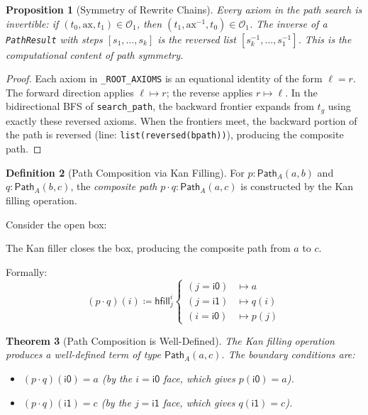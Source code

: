 \documentclass[11pt,a4paper]{report}
\theoremstyle{definition}
\newtheorem{definition}{Definition}[chapter]
\theoremstyle{plain}
\newtheorem{theorem}[definition]{Theorem}
\newtheorem{proposition}[definition]{Proposition}
\newcommand{\Path}{\mathsf{Path}}
\newcommand{\hfilling}{\mathsf{hfill}}
\begin{document}
\begin{proposition}[Symmetry of Rewrite Chains]
\label{prop:symmetry-rewrite}
Every axiom in the path search is invertible: if
$(t_0, \mathrm{ax}, t_1) \in \mathcal{O}_1$, then
$(t_1, \mathrm{ax}^{-1}, t_0) \in \mathcal{O}_1$.  The inverse of
a \texttt{PathResult} with steps $[s_1, \ldots, s_k]$ is the reversed
list $[s_k^{-1}, \ldots, s_1^{-1}]$.  This is the computational
content of path symmetry.
\end{proposition}

\begin{proof}
Each axiom in \texttt{\_ROOT\_AXIOMS} is an equational identity of the
form $\ell = r$.  The forward direction applies $\ell \mapsto r$;
the reverse applies $r \mapsto \ell$.  In the bidirectional BFS of
\texttt{search\_path}, the backward frontier expands from $t_g$ using
exactly these reversed axioms.  When the frontiers meet, the backward
portion of the path is reversed (line: \texttt{list(reversed(bpath))}),
producing the composite path.
\end{proof}

\begin{definition}[Path Composition via Kan Filling]
\label{def:composition}
For $p : \Path_A(a, b)$ and $q : \Path_A(b, c)$, the
\emph{composite path} $p \cdot q : \Path_A(a, c)$ is constructed
by the Kan filling operation.

Consider the open box:
\begin{center}
\end{center}

The Kan filler closes the box, producing the composite path from $a$
to $c$.

Formally:
\[
  (p \cdot q)(i) \coloneqq \hfilling^i_{j}
    \begin{cases}
      (j = \mathsf{i0}) &\mapsto a \\
      (j = \mathsf{i1}) &\mapsto q(i) \\
      (i = \mathsf{i0}) &\mapsto p(j)
    \end{cases}
\]
\end{definition}

\begin{theorem}[Path Composition is Well-Defined]
\label{thm:comp-welldef}
The Kan filling operation produces a well-defined term of type
$\Path_A(a, c)$.  The boundary conditions are:
\begin{itemize}
  \item $(p \cdot q)(\mathsf{i0}) = a$ (by the $i = \mathsf{i0}$
    face, which gives $p(\mathsf{i0}) = a$).
  \item $(p \cdot q)(\mathsf{i1}) = c$ (by the $j = \mathsf{i1}$
    face, which gives $q(\mathsf{i1}) = c$).
\end{itemize}
\end{theorem}
\end{document}
